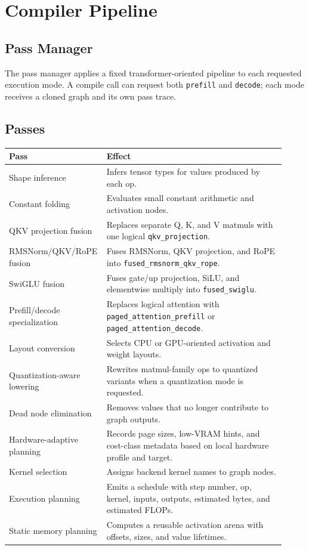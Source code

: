 \documentclass[11pt]{article}
\begin{document}
\section{Compiler Pipeline}

\subsection{Pass Manager}

The pass manager applies a fixed transformer-oriented pipeline to each requested
execution mode. A compile call can request both \texttt{prefill} and
\texttt{decode}; each mode receives a cloned graph and its own pass trace.

\subsection{Passes}

\begin{longtable}{p{0.28\linewidth}p{0.64\linewidth}}
\toprule
\textbf{Pass} & \textbf{Effect} \\
\midrule
Shape inference & Infers tensor types for values produced by each op. \\
Constant folding & Evaluates small constant arithmetic and activation nodes. \\
QKV projection fusion & Replaces separate Q, K, and V matmuls with one logical
\texttt{qkv\_projection}. \\
RMSNorm/QKV/RoPE fusion & Fuses RMSNorm, QKV projection, and RoPE into
\texttt{fused\_rmsnorm\_qkv\_rope}. \\
SwiGLU fusion & Fuses gate/up projection, SiLU, and elementwise multiply into
\texttt{fused\_swiglu}. \\
Prefill/decode specialization & Replaces logical attention with
\texttt{paged\_attention\_prefill} or \texttt{paged\_attention\_decode}. \\
Layout conversion & Selects CPU or GPU-oriented activation and weight layouts. \\
Quantization-aware lowering & Rewrites matmul-family ops to quantized variants
when a quantization mode is requested. \\
Dead node elimination & Removes values that no longer contribute to graph
outputs. \\
Hardware-adaptive planning & Records page sizes, low-VRAM hints, and cost-class
metadata based on local hardware profile and target. \\
Kernel selection & Assigns backend kernel names to graph nodes. \\
Execution planning & Emits a schedule with step number, op, kernel, inputs,
outputs, estimated bytes, and estimated FLOPs. \\
Static memory planning & Computes a reusable activation arena with offsets,
sizes, and value lifetimes. \\
\bottomrule
\end{longtable}
\end{document}
